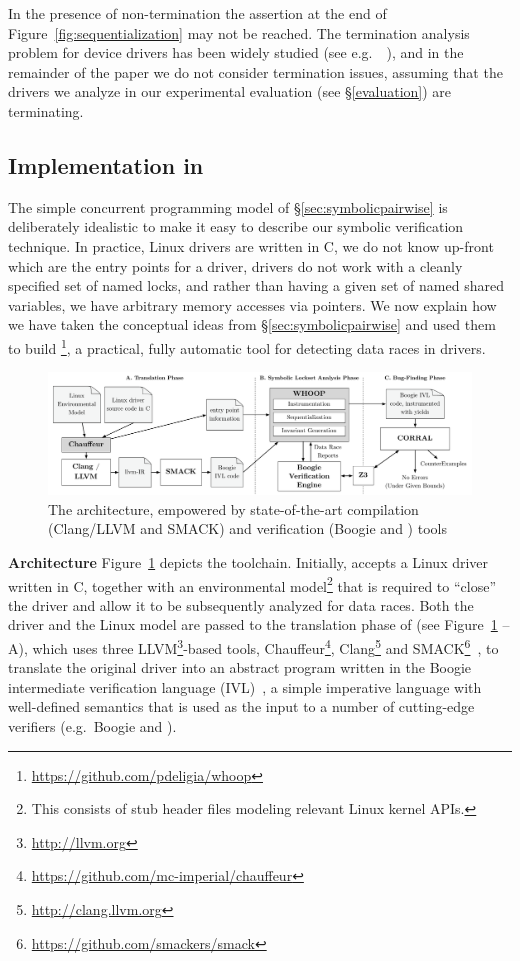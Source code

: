 In the presence of non-termination the assertion at the end of Figure~\ref{fig:sequentialization} may not be reached.  The termination analysis problem for device drivers has been widely studied (see e.g.\ ~\cite{cook2006termination}), and in the remainder of the paper we do not consider termination issues, assuming that the drivers we analyze in our experimental evaluation (see \S\ref{evaluation}) are terminating.

\subsection{Implementation in \whoop}
\label{sec:implementation}

The simple concurrent programming model of \S\ref{sec:symbolicpairwise} is deliberately idealistic to make it easy to describe our symbolic verification technique. In practice, Linux drivers are written in C, we do not know up-front which are the entry points for a driver, drivers do not work with a cleanly specified set of named locks, and rather than having a given set of named shared variables, we have arbitrary memory accesses via pointers. We now explain how we have taken the conceptual ideas from \S\ref{sec:symbolicpairwise} and used them to build \whoop\footnote{\url{https://github.com/pdeligia/whoop}}, a practical, fully automatic tool for detecting data races in drivers.

\begin{figure}
\centering
\includegraphics[width=.99\linewidth]{img/whoop.pdf}
\caption{The \whoop architecture, empowered by state-of-the-art compilation (Clang/LLVM and SMACK) and verification (Boogie and \corral) tools}
\label{fig:whoop}
\end{figure}

\noindent\textbf{Architecture }
%
Figure~\ref{fig:whoop} depicts the \whoop toolchain. Initially, \whoop accepts a Linux driver written in C, together with an environmental model\footnote{This consists of stub header files modeling relevant Linux kernel APIs.} that is required to ``close'' the driver and allow it to be subsequently analyzed for data races. Both the driver and the Linux model are passed to the translation phase of \whoop (see Figure~\ref{fig:whoop} -- A), which uses three LLVM\footnote{\url{http://llvm.org}}-based tools, Chauffeur\footnote{\url{https://github.com/mc-imperial/chauffeur}}, Clang\footnote{\url{http://clang.llvm.org}} and SMACK\footnote{\url{https://github.com/smackers/smack}}~\cite{rakamaric2014smack}, to translate the original driver into an abstract program written in the Boogie intermediate verification language (IVL)~\cite{deline2005boogiepl}, a simple imperative language with well-defined semantics that is used as the input to a number of cutting-edge verifiers (e.g.\ Boogie and \corral).

